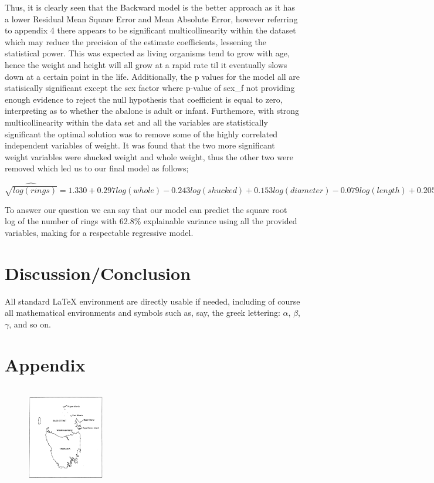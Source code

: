 \documentclass[letterpaper,9pt,twocolumn,twoside,]{pinp}
\begin{document}
Thus, it is clearly seen that the Backward model is the better approach
as it has a lower Residual Mean Square Error and Mean Absolute Error,
however referring to appendix 4 there appears to be significant
multicollinearity within the dataset which may reduce the precision of
the estimate coefficients, lessening the statistical power. This was
expected as living organisms tend to grow with age, hence the weight and
height will all grow at a rapid rate til it eventually slows down at a
certain point in the life. Additionally, the p values for the model all
are statisically significant except the sex factor where p-value of
sex\_f not providing enough evidence to reject the null hypothesis that
coefficient is equal to zero, interpreting as to whether the abalone is
adult or infant. Furthemore, with strong multicollinearity within the
data set and all the variables are statistically significant the optimal
solution was to remove some of the highly correlated independent
variables of weight. It was found that the two more significant weight
variables were shucked weight and whole weight, thus the other two were
removed which led us to our final model as follows;

\(\widehat{\sqrt{log(rings)}} = 1.330 + 0.297 log(whole) -0.243 log(shucked) + 0.153 log(diameter) -0.079 log(length) + 0.205\sqrt{height} -0.013 Sex_{infant}\)

To answer our question we can say that our model can predict the square
root log of the number of rings with 62.8\% explainable variance using
all the provided variables, making for a respectable regressive model.

\hypertarget{discussionconclusion}{%
\section{Discussion/Conclusion}\label{discussionconclusion}}

All standard LaTeX environment are directly usable if needed, including
of course all mathematical environments and symbols such as, say, the
greek lettering: \(\alpha\), \(\beta\), \(\gamma\), and so on.

\hypertarget{appendix}{%
\section{Appendix}\label{appendix}}

\begin{figure}[!h]
    \begin{center}
    \includegraphics[width=0.3\textwidth, height=1.8in]{Independence} 
    \end{center}
\end{figure}
\end{document}
